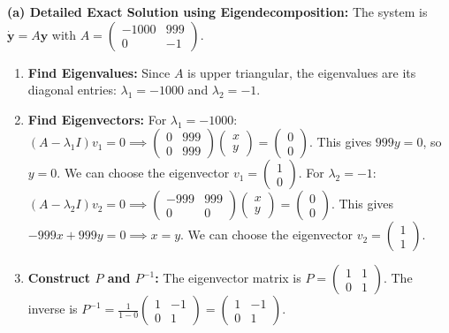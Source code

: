 \begin{solution}
\textbf{(a) Detailed Exact Solution using Eigendecomposition:}
The system is $\dot{\mathbf{y}} = A\mathbf{y}$ with $A = \begin{pmatrix} -1000 & 999 \\ 0 & -1 \end{pmatrix}$.
\begin{enumerate}
    \item \textbf{Find Eigenvalues:} Since $A$ is upper triangular, the eigenvalues are its diagonal entries: $\lambda_1 = -1000$ and $\lambda_2 = -1$.
    \item \textbf{Find Eigenvectors:}
    For $\lambda_1 = -1000$: $(A - \lambda_1 I)v_1 = 0 \implies \begin{pmatrix} 0 & 999 \\ 0 & 999 \end{pmatrix} \begin{pmatrix} x \\ y \end{pmatrix} = \begin{pmatrix} 0 \\ 0 \end{pmatrix}$. This gives $999y = 0$, so $y=0$. We can choose the eigenvector $v_1 = \begin{pmatrix} 1 \\ 0 \end{pmatrix}$.
    For $\lambda_2 = -1$: $(A - \lambda_2 I)v_2 = 0 \implies \begin{pmatrix} -999 & 999 \\ 0 & 0 \end{pmatrix} \begin{pmatrix} x \\ y \end{pmatrix} = \begin{pmatrix} 0 \\ 0 \end{pmatrix}$. This gives $-999x + 999y = 0 \implies x=y$. We can choose the eigenvector $v_2 = \begin{pmatrix} 1 \\ 1 \end{pmatrix}$.
    \item \textbf{Construct $P$ and $P^{-1}$:} The eigenvector matrix is $P = \begin{pmatrix} 1 & 1 \\ 0 & 1 \end{pmatrix}$. The inverse is $P^{-1} = \frac{1}{1-0} \begin{pmatrix} 1 & -1 \\ 0 & 1 \end{pmatrix} = \begin{pmatrix} 1 & -1 \\ 0 & 1 \end{pmatrix}$.

\end{enumerate}
\end{solution}
